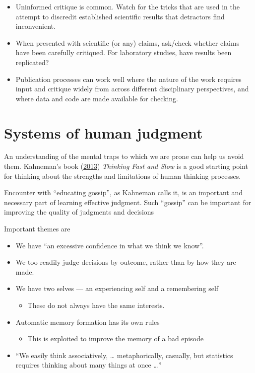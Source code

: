 \documentclass[
  10pt,
  b5paper]{book}
\providecommand{\tightlist}{%
  \setlength{\itemsep}{0pt}\setlength{\parskip}{0pt}}
\begin{document}
\begin{enumerate}
  \begin{itemize}
  \tightlist
  \item
    Uninformed critique is common. Watch for the
    tricks that are used in the attempt to discredit established
    scientific results that detractors find inconvenient.
  \item
    When presented with scientific (or any) claims, ask/check
    whether claims have been carefully critiqued. For laboratory
    studies, have results been replicated?
  \item
    Publication processes can work well where the nature of the
    work requires input and critique widely from across different
    disciplinary perspectives, and where data and code are made
    available for checking.
  \end{itemize}
\end{enumerate}

\mainmatter

\hypertarget{systems-of-human-judgment}{%
\chapter{Systems of human judgment}\label{systems-of-human-judgment}}

An understanding of the mental traps to which we are prone
can help us avoid them. Kahneman's book (\protect\hyperlink{ref-kahneman_2013}{2013})
\emph{Thinking Fast and Slow} is a good starting point for
thinking about the strengths and limitations of human
thinking processes.

Encounter with ``educating gossip'', as Kahneman calls it, is an
important and necessary part of learning effective judgment.
Such ``gossip'' can be important for improving the quality
of judgments and decisions

Important themes are

\begin{itemize}
\tightlist
\item
  We have ``an excessive confidence in what we think we know''.
\item
  We too readily judge decisions by outcome, rather than by how they are made.
\item
  We have two selves --- an experiencing self and a remembering self

  \begin{itemize}
  \tightlist
  \item
    These do not always have the same interests.
  \end{itemize}
\item
  Automatic memory formation has its own rules

  \begin{itemize}
  \tightlist
  \item
    This is exploited to improve the memory of a bad episode
  \end{itemize}
\item
  ``We easily think associatively, \ldots{} metaphorically, casually,
  but statistics requires thinking about many things at once \ldots{}''
\end{itemize}
\end{document}

